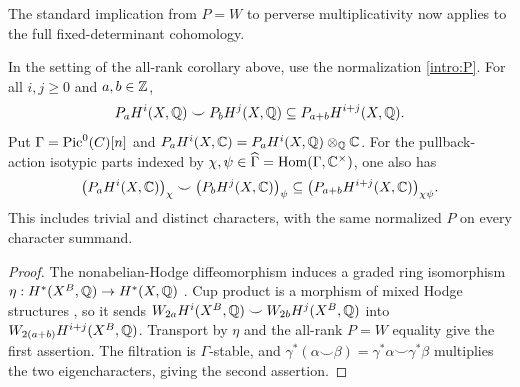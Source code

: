 The standard implication from $P=W$ to perverse multiplicativity
\cite[Section~0.4.3, equation~(10)]{dCMSJAMS2022} now applies to the full
fixed-determinant cohomology.

\begin{corollary}\label{cor:perverse-multiplicativity}
In the setting of the all-rank corollary above, use the normalization
\eqref{intro:P}. For all $i,j\ge0$ and $a,b\in\mathbb Z$,
\[
P_aH^i(X,\mathbb Q)\smile P_bH^j(X,\mathbb Q)
\subseteq P_{a+b}H^{i+j}(X,\mathbb Q).
\]
Put $\Gamma=\operatorname{Pic}^0(C)[n]$ and
$P_aH^i(X,\mathbb C)=P_aH^i(X,\mathbb Q)\otimes_{\mathbb Q}\mathbb C$. For the pullback-action
isotypic parts indexed by $\chi,\psi\in\widehat\Gamma
=\operatorname{Hom}(\Gamma,\mathbb C^\times)$, one also has
\[
\bigl(P_aH^i(X,\mathbb C)\bigr)_\chi\smile
\bigl(P_bH^j(X,\mathbb C)\bigr)_\psi
\subseteq\bigl(P_{a+b}H^{i+j}(X,\mathbb C)\bigr)_{\chi\psi}.
\]
This includes trivial and distinct characters, with the same normalized
$P$ on every character summand.
\end{corollary}
\begin{proof}
The nonabelian-Hodge diffeomorphism induces a graded ring isomorphism
$\eta:H^*(X^B,\mathbb Q)\to H^*(X,\mathbb Q)$ \cite[Sections~2 and~5]{HT2003}.
Cup product is a morphism of mixed Hodge structures
\cite[Corollaire~(8.2.11)]{Deligne1974}, so it sends
$W_{2a}H^i(X^B,\mathbb Q)\smile W_{2b}H^j(X^B,\mathbb Q)$ into
$W_{2(a+b)}H^{i+j}(X^B,\mathbb Q)$. Transport by $\eta$ and the all-rank
$P=W$ equality give the first assertion. The filtration is
$\Gamma$-stable, and
$\gamma^*(\alpha\smile\beta)=\gamma^*\alpha\smile\gamma^*\beta$
multiplies the two eigencharacters, giving the second assertion.
\end{proof}
